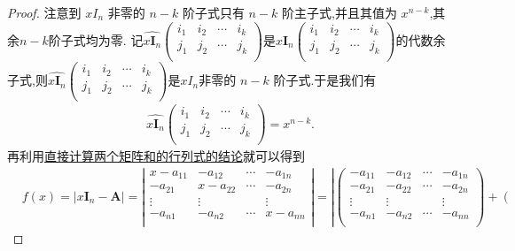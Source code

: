 \documentclass[lang=cn,newtx,10pt,scheme=chinese]{elegantbook}
\begin{document}
\begin{proof}
注意到 \(xI_{n}\) 非零的 \(n - k\) 阶子式只有 \(n - k\) 阶主子式,并且其值为 \(x^{n - k}\),其余$n-k$阶子式均为零.
记$\widehat{x\boldsymbol{I}_n}\left( \begin{matrix}
i_1&		i_2&		\cdots&		i_k\\
j_1&		j_2&		\cdots&		j_k\\
\end{matrix} \right)$是$x\boldsymbol{I}_n\left( \begin{matrix}
i_1&		i_2&		\cdots&		i_k\\
j_1&		j_2&		\cdots&		j_k\\
\end{matrix} \right)$的代数余子式,则$\widehat{x\boldsymbol{I}_n}\left( \begin{matrix}
i_1&		i_2&		\cdots&		i_k\\
j_1&		j_2&		\cdots&		j_k\\
\end{matrix} \right)$是\(xI_{n}\)非零的 \(n - k\) 阶子式.于是我们有
\begin{align*}
\widehat{x\boldsymbol{I}_n}\left( \begin{matrix}
i_1&		i_2&		\cdots&		i_k\\
j_1&		j_2&		\cdots&		j_k\\
\end{matrix} \right) =x^{n-k}.
\end{align*}
再利用\hyperref[proposition:直接计算两个矩阵和的行列式]{直接计算两个矩阵和的行列式的结论}就可以得到
\begin{align*}
&f(x)=|x\boldsymbol{I}_n-\boldsymbol{A}|=\left| \begin{matrix}
x-a_{11}&		-a_{12}&		\cdots&		-a_{1n}\\
-a_{21}&		x-a_{22}&		\cdots&		-a_{2n}\\
\vdots&		\vdots&		&		\vdots\\
-a_{n1}&		-a_{n2}&		\cdots&		x-a_{nn}\\
\end{matrix} \right|=\left| \left( \begin{matrix}
-a_{11}&		-a_{12}&		\cdots&		-a_{1n}\\
-a_{21}&		-a_{22}&		\cdots&		-a_{2n}\\
\vdots&		\vdots&		&		\vdots\\
-a_{n1}&		-a_{n2}&		\cdots&		-a_{nn}\\
\end{matrix} \right) +\left( \begin{matrix}

\end{matrix}
\end{align*}
\end{proof}
\end{document}
